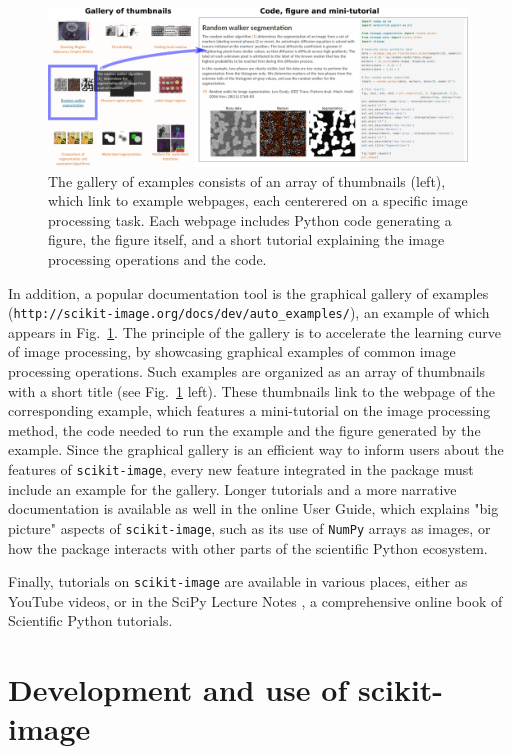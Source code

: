 \documentclass[twocolumn]{bmcart}%
\begin{document}
\begin{figure}
    \centerline{\includegraphics[width=0.99\textwidth]{figure_gallery}}
\caption{
 The gallery of examples consists of an array of thumbnails (left), which link to example webpages, each centerered on a specific image processing task. Each webpage includes Python code generating a figure, the figure itself, and a short tutorial explaining the image processing operations and the code. \label{fig:gallery}}
\end{figure}

In addition, a popular documentation tool is the graphical gallery of
examples (\nolinkurl{http://scikit-image.org/docs/dev/auto_examples/}),
an example of which appears in Fig.~\ref{fig:gallery}.
The principle of the gallery is to accelerate the learning curve of image
processing, by showcasing graphical examples of common image processing
operations. Such examples are organized as an array of thumbnails with a
short title (see Fig.~\ref{fig:gallery} left). These thumbnails link to
the webpage of the corresponding example, which features a mini-tutorial
on the image processing method, the code needed to run the example and
the figure generated by the example. Since the graphical gallery is an
efficient way to inform users about the features of
\texttt{scikit-image}, every new feature integrated in the package must
include an example for the gallery.
Longer tutorials and a more narrative documentation is available as well
in the online User Guide, which explains
"big picture" aspects of \texttt{scikit-image}, such as its
use of \texttt{NumPy} arrays as images, or how the package interacts with
other parts of the scientific Python ecosystem.

Finally, tutorials on \texttt{scikit-image} are available in various
places, either as YouTube videos, or in the SciPy Lecture
Notes \citep{scipylecturenotes}, a comprehensive online book of Scientific
Python tutorials.  

\section*{Development and use of scikit-image}
\end{document}
